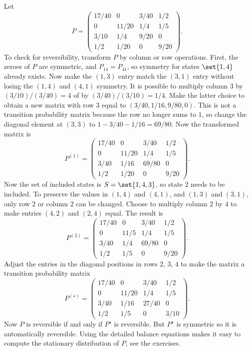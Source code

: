 \documentclass[12pt]{article}
\begin{document}
\begin{example}
  Let
  \[
    P =
    \begin{pmatrix}
      17/40 & 0 & 3/40 & 1/2 \\
      0     & 11/20 & 1/4 & 1/5 \\
      3/10  & 1/4   & 9/20 & 0 \\
      1/2   & 1/20  & 0    & 9/20
    \end{pmatrix}.
  \]
  To check for reversibility, transform $P$ by column or row
  operations.  First, the zeroes of $P$ are symmetric, and $P_{14} =
  P_{41}$, so symmetry for states $\set{1,4}$ already exists.
Now make the $(1,3)$ entry match the $(3,1)$ entry without losing the
$(1,4)$ and $(4,1)$ symmetry.  It is possible to multiply column $3$
by $(3/10)/(3/40) = 4$ of by $(3/40)/(3/10) = 1/4$.   Make the latter
choice to obtain a new matrix with row $3$ equal to $(3/40, 1/16,
9/80, 0)$.  This is not a transition probability matrix because the
row no longer sums to $1$, so change the diagonal element at $(3,3)$
to $1 - 3/40 - 1/16 = 69/80$.  Now the transformed matrix is
  \[
    P^{(1)} =
    \begin{pmatrix}
      17/40 & 0 & 3/40 & 1/2 \\
      0     & 11/20 & 1/4 & 1/5 \\
      3/40  & 1/16   & 69/80 & 0 \\
      1/2   & 1/20  & 0    & 9/20
    \end{pmatrix}.
  \]
Now the set of included states is $S = \set{1,4,3}$, so state $2$
needs to be included.  To preserve the values in $(1,4)$ and $(4,1)$,
and $(1,3)$ and $(3,1)$, only row $2$ or column $2$ can be changed.
Choose to multiply column $2$ by $4$ to make entries $(4,2)$ and
$(2,4)$ equal.  The result is
  \[
    P^{(2)} =
    \begin{pmatrix}
      17/40 & 0 & 3/40 & 1/2 \\
      0     & 11/5 & 1/4 & 1/5 \\
      3/40  & 1/4   & 69/80 & 0 \\
      1/2   & 1/5  & 0    & 9/20
    \end{pmatrix}.
  \]
Adjust the entries in the diagonal positions in rows $2$, $3$, $4$ to
make the matrix a transition probability matrix
  \[
    P^{(\star)} =
    \begin{pmatrix}
      17/40 & 0 & 3/40 & 1/2 \\
      0     & 11/20 & 1/4 & 1/5 \\
      3/40  & 1/16   & 27/40 & 0 \\
      1/2   & 1/5  & 0    & 3/10
    \end{pmatrix}.
  \]
Now $P$ is reversible if and only if $P^{\star}$ is reversible.  But
$P^{\star}$ is symmetric so it is automatically reversible.  Using the
detailed balance equations makes it easy to compute the stationary
distribution of $P$, see the exercises.

\end{example}
\end{document}
